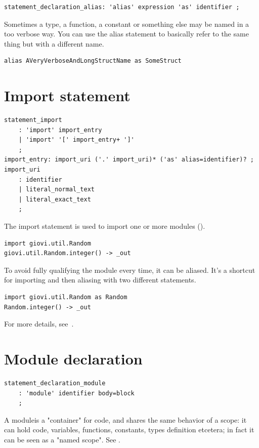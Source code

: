 \begin{verbatim}
statement_declaration_alias: 'alias' expression 'as' identifier ;
\end{verbatim}

Sometimes a type, a function, a constant or something else may be named in a
too verbose way. You can use the alias statement to basically refer to the same
thing but with a different name.

\begin{verbatim}
alias AVeryVerboseAndLongStructName as SomeStruct
\end{verbatim}

\section{Import statement}

\begin{verbatim}
statement_import
	: 'import' import_entry
	| 'import' '[' import_entry+ ']'
	;
import_entry: import_uri ('.' import_uri)* ('as' alias=identifier)? ;
import_uri
	: identifier
	| literal_normal_text
	| literal_exact_text
	;
\end{verbatim}

The import statement is used to import one or more modules
().

\begin{verbatim}
import giovi.util.Random
giovi.util.Random.integer() -> _out
\end{verbatim}

To avoid fully qualifying the module every time, it can be aliased. It's a
shortcut for importing and then aliasing with two different statements.

\begin{verbatim}
import giovi.util.Random as Random
Random.integer() -> _out
\end{verbatim}

For more details, see~.

\section{Module declaration}

\begin{verbatim}
statement_declaration_module
	: 'module' identifier body=block
	;
\end{verbatim}

A module\footnotemark[1] is a "container" for code, and shares the same behavior of a scope: it
can hold code, variables, functions, constants, types definition etcetera; in
fact it can be seen as a "named scope". See .

